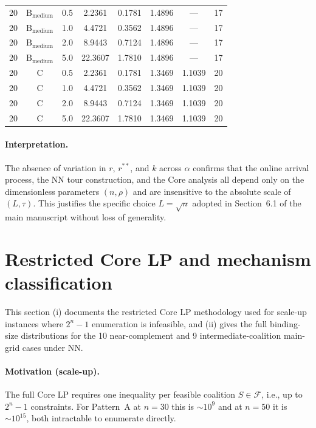 \documentclass[11pt]{article}
\begin{document}
\begin{table}[htbp]
\begin{tabular}{@{}cccccccc@{}}
\midrule
20 & $\text{B}_{\text{medium}}$ & 0.5 & 2.2361 & 0.1781 & 1.4896 & --- & 17 \\
20 & $\text{B}_{\text{medium}}$ & 1.0 & 4.4721 & 0.3562 & 1.4896 & --- & 17 \\
20 & $\text{B}_{\text{medium}}$ & 2.0 & 8.9443 & 0.7124 & 1.4896 & --- & 17 \\
20 & $\text{B}_{\text{medium}}$ & 5.0 & 22.3607 & 1.7810 & 1.4896 & --- & 17 \\
\midrule
20 & C & 0.5 & 2.2361 & 0.1781 & 1.3469 & 1.1039 & 20 \\
20 & C & 1.0 & 4.4721 & 0.3562 & 1.3469 & 1.1039 & 20 \\
20 & C & 2.0 & 8.9443 & 0.7124 & 1.3469 & 1.1039 & 20 \\
20 & C & 5.0 & 22.3607 & 1.7810 & 1.3469 & 1.1039 & 20 \\
\bottomrule
\end{tabular}
\end{table}

\paragraph{Interpretation.} The absence of variation in $r$, $r^{\ast\ast}$, and $k$ across $\alpha$ confirms that the online arrival process, the NN tour construction, and the Core analysis all depend only on the dimensionless parameters $(n,\rho)$ and are insensitive to the absolute scale of $(L,\tau)$. This justifies the specific choice $L=\sqrt{n}$ adopted in Section~6.1 of the main manuscript without loss of generality.

\section{Restricted Core LP and mechanism classification}
\label{app:restricted-lp}

This section (i) documents the restricted Core LP methodology used for scale-up instances where $2^n-1$ enumeration is infeasible, and (ii) gives the full binding-size distributions for the 10 near-complement and 9 intermediate-coalition main-grid cases under NN.

\paragraph{Motivation (scale-up).} The full Core LP requires one inequality per feasible coalition $S\in\mathcal{F}$, i.e., up to $2^n-1$ constraints. For Pattern~A at $n=30$ this is $\sim 10^9$ and at $n=50$ it is $\sim 10^{15}$, both intractable to enumerate directly.
\end{document}

